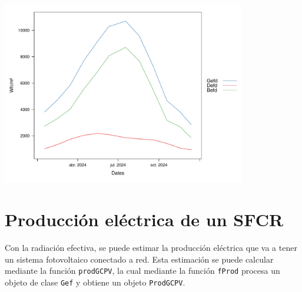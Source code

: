 \begin{center}
\includegraphics[width=0.8\textwidth]{figuras/codigo-gef.pdf}
\end{center}
\section{Producción eléctrica de un SFCR}
\label{sec:orgd14d003}
\label{produccion-electrica-sfcr}
Con la radiación efectiva, se puede estimar la producción eléctrica que va a tener un sistema fotovoltaico conectado a red. Esta estimación se puede calcular mediante la función \texttt{prodGCPV}, la cual mediante la función \texttt{fProd} procesa un objeto de clase \texttt{Gef} y obtiene un objeto \texttt{ProdGCPV}.

